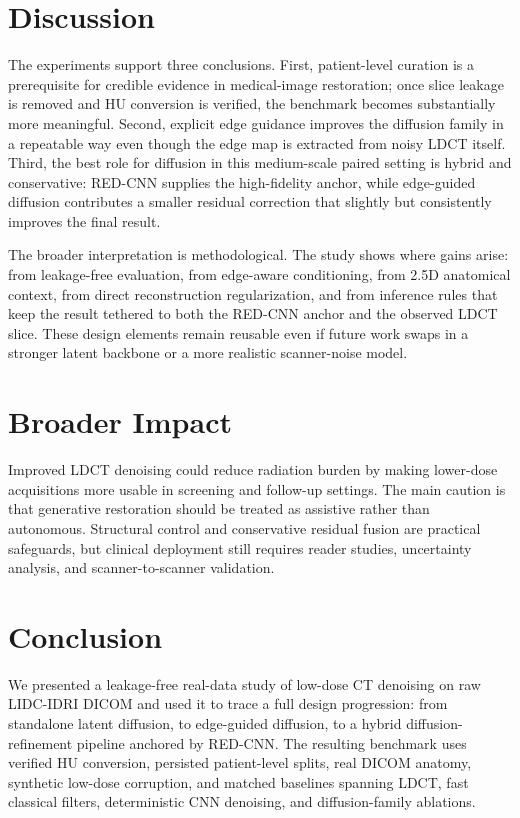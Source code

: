 \documentclass{article}
\begin{document}
\section{Discussion}
The experiments support three conclusions. First, patient-level curation is a prerequisite for credible evidence in medical-image restoration; once slice leakage is removed and HU conversion is verified, the benchmark becomes substantially more meaningful. Second, explicit edge guidance improves the diffusion family in a repeatable way even though the edge map is extracted from noisy LDCT itself. Third, the best role for diffusion in this medium-scale paired setting is hybrid and conservative: RED-CNN supplies the high-fidelity anchor, while edge-guided diffusion contributes a smaller residual correction that slightly but consistently improves the final result.

The broader interpretation is methodological. The study shows where gains arise: from leakage-free evaluation, from edge-aware conditioning, from 2.5D anatomical context, from direct reconstruction regularization, and from inference rules that keep the result tethered to both the RED-CNN anchor and the observed LDCT slice. These design elements remain reusable even if future work swaps in a stronger latent backbone or a more realistic scanner-noise model.

\section{Broader Impact}
Improved LDCT denoising could reduce radiation burden by making lower-dose acquisitions more usable in screening and follow-up settings. The main caution is that generative restoration should be treated as assistive rather than autonomous. Structural control and conservative residual fusion are practical safeguards, but clinical deployment still requires reader studies, uncertainty analysis, and scanner-to-scanner validation.

\section{Conclusion}
We presented a leakage-free real-data study of low-dose CT denoising on raw LIDC-IDRI DICOM and used it to trace a full design progression: from standalone latent diffusion, to edge-guided diffusion, to a hybrid diffusion-refinement pipeline anchored by RED-CNN. The resulting benchmark uses verified HU conversion, persisted patient-level splits, real DICOM anatomy, synthetic low-dose corruption, and matched baselines spanning LDCT, fast classical filters, deterministic CNN denoising, and diffusion-family ablations.
\end{document}
